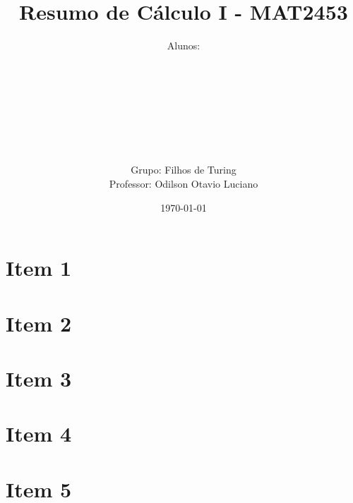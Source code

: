 \documentclass[12pt, a4paper]{article}
\title{
	Resumo de Cálculo I - MAT2453
}
\author{
	Alunos:
	\\  
	\\ 
	\\ 
	\\ 
	\\ 
	\\ 
	\\ 
	\\ \\
	Grupo: Filhos de Turing
	\\ Professor: Odilson Otavio Luciano
}
\date{\today}
\begin{document}
	\maketitle
	\thispagestyle{empty}
	\newpage

	\section{Item 1}

	

	\section{Item 2}

	

	\section{Item 3}

	

	\section{Item 4}

	

	\section{Item 5}

	
\end{document}
